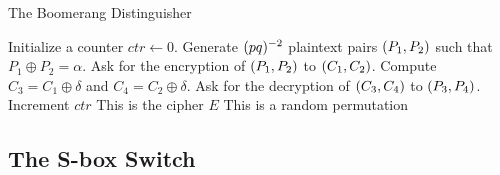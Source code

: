 \documentclass[notheorems]{beamer}
\theoremstyle{definition}
\theoremstyle{example}
\begin{document}
    \begin{frame}{The Boomerang Distinguisher}
        \vspace{-1em}
        \begin{algorithm}[H]
            \caption{The Boomerang Attack Distinguisher}
            \label{alg:boomerang-dist}
            \begin{algorithmic}[1]
                \State Initialize a counter \(ctr \gets 0\). 
                \State Generate \((pq)^{-2}\) plaintext pairs \((P_1, P_2)\)
                such that \(P_1 \oplus P_2 = \alpha\).
                    \State Ask for the encryption of \((P_1, P_2)\) to \((C_1,
                    C_2)\).
                    \State Compute \(C_3 = C_1 \oplus \delta\) and \(C_4 = C_2 \oplus 
                    \delta\). 
                    \State Ask for the decryption of \((C_3, C_4)\) to \((P_3,
                    P_4)\).
                        \State Increment \(ctr\)
                    \EndIf
                \EndFor
                    \State \Return This is the cipher \(E\)
                \Else
                    \State \Return This is a random permutation
                \EndIf
            \end{algorithmic}
        \end{algorithm}
    \end{frame}

    \subsection{The S-box Switch}
    \label{subsec:s-box-switch}
    
\end{document}
